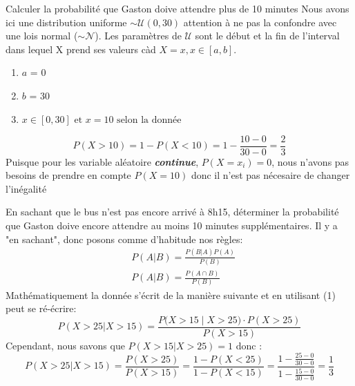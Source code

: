 \begin{exo}
	\begin{subexo}{Calculer la probabilité que Gaston doive attendre plus de 10 minutes}
		Nous avons ici une distribution uniforme $\sim \mathcal{U}(0,30)$ attention à ne
		pas la confondre avec une lois normal ($\sim \mathcal{N}$). Les paramètres de $\mathcal{U}$
		sont le début et la fin de l'interval dans lequel X prend ses valeurs càd $X=x, x \in [a,b]$.
		\begin{enumerate}
			\item $a$ = 0
			\item $b$ = 30
			\item $x \in [0,30] \text{ et } x = 10 \text{ selon la donnée}$
		\end{enumerate}
		\[
			P(X > 10) = 1 - P(X < 10) = 1 - \frac{10 - 0}{30 - 0} = \frac{2}{3}
		\]
		Puisque pour les variable aléatoire \textbf{\textit{continue}}, $P(X=x_i) = 0$,
		nous n'avons pas besoins de prendre en compte $P(X=10)$ donc il n'est pas nécesaire de changer l'inégalité
	\end{subexo}
	\begin{subexo}{En sachant que le bus n'est pas encore arrivé à 8h15, déterminer la probabilité
			que Gaston doive encore attendre au moins 10 minutes supplémentaires.}
		Il y a "en sachant", donc posons comme d'habitude nos règles:
		\begin{align}
			 & P(A | B) = \frac{P(B|A) P(A)}{P(B)} \\
			 & P(A | B) = \frac{P(A \cap B)}{P(B)}
		\end{align}
		Mathématiquement la donnée s'écrit de la manière suivante et en utilisant (1) peut se ré-écrire:
		\[
			P(X>25 | X>15) = \frac{P\bigl(X>15 \;\bigl|\;X>25\bigr) \cdot P(X>25)}{P(X>15)}
		\]
		Cependant, nous savons que $P(X>15 | X>25) = 1$ donc :
		\[
			P(X>25 | X>15) = \frac{P(X>25)}{P(X>15)} = \frac{1 - P(X<25)}{1-P(X<15)} = 
			\frac{1-\frac{25-0}{30-0}}{1-\frac{15-0}{30-0}} = \frac{1}{3}
		\]	
	\end{subexo}
\end{exo}
